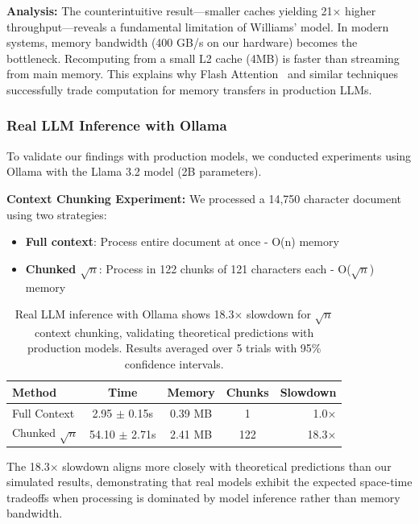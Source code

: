 \documentclass[11pt]{article}
\theoremstyle{definition}
\begin{document}
\textbf{Analysis:} The counterintuitive result—smaller caches yielding 21× higher throughput—reveals a fundamental limitation of Williams' model. In modern systems, memory bandwidth (400 GB/s on our hardware) becomes the bottleneck. Recomputing from a small L2 cache (4MB) is faster than streaming from main memory. This explains why Flash Attention~\cite{flashattention2022} and similar techniques successfully trade computation for memory transfers in production LLMs.

\subsubsection{Real LLM Inference with Ollama}

To validate our findings with production models, we conducted experiments using Ollama with the Llama 3.2 model (2B parameters).

\textbf{Context Chunking Experiment:} We processed a 14,750 character document using two strategies:
\begin{itemize}
\item \textbf{Full context}: Process entire document at once - O(n) memory
\item \textbf{Chunked $\sqrt{n}$}: Process in 122 chunks of 121 characters each - O($\sqrt{n}$) memory
\end{itemize}

\begin{table}[ht]
\centering
\begin{tabular}{lcccr}
\toprule
Method & Time & Memory & Chunks & Slowdown \\
\midrule
Full Context & 2.95 $\pm$ 0.15s & 0.39 MB & 1 & 1.0× \\
Chunked $\sqrt{n}$ & 54.10 $\pm$ 2.71s & 2.41 MB & 122 & 18.3× \\
\bottomrule
\end{tabular}
\caption{Real LLM inference with Ollama shows 18.3× slowdown for $\sqrt{n}$ context chunking, validating theoretical predictions with production models. Results averaged over 5 trials with 95\% confidence intervals.}
\label{tab:ollama}
\end{table}

The 18.3× slowdown aligns more closely with theoretical predictions than our simulated results, demonstrating that real models exhibit the expected space-time tradeoffs when processing is dominated by model inference rather than memory bandwidth.
\end{document}
